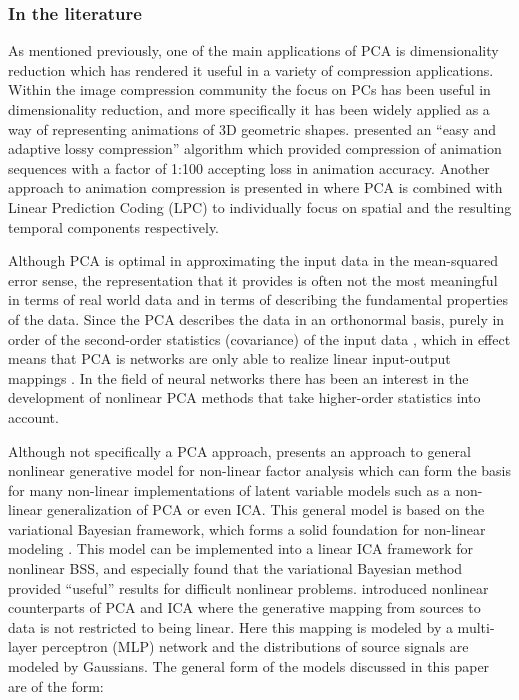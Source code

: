 \subsubsection{In the literature}
As mentioned previously, one of the main applications of PCA is dimensionality reduction which has rendered it useful in a variety of compression applications. Within the image compression community \citep{Vasilescu2003} the focus on PCs has been useful in dimensionality reduction, and more specifically it has been widely applied as a way of representing animations of 3D geometric shapes. \cite{Alexa2000} presented an ``easy and adaptive lossy compression'' algorithm which provided compression of animation sequences with a factor of 1:100 accepting loss in animation accuracy. Another approach to animation compression is presented in \cite{Karni2004} where PCA is combined with Linear Prediction Coding (LPC) to individually focus on spatial and the resulting temporal components respectively.

Although PCA is optimal in approximating the input data in the mean-squared error sense, the representation that it provides is often not the most meaningful in terms of real world data and in terms of describing the fundamental properties of the data. Since the PCA describes the data in an orthonormal basis, purely in order of the second-order statistics (covariance) of the input data \citep{Oja1995}, which in effect means that PCA is networks are only able to realize linear input-output mappings \citep{Karhunen1995}. In the field of neural networks there has been an interest in the development of nonlinear PCA methods that take higher-order statistics into account.

Although not specifically a PCA approach, \cite{Honkela2005} presents an approach to general nonlinear generative model for non-linear factor analysis which can form the basis for many non-linear implementations of latent variable models such as a non-linear generalization of PCA or even ICA. This general model is based on the variational Bayesian framework, which forms a solid foundation for non-linear modeling \citep{Honkela2005}. This model can be implemented into a linear ICA framework for nonlinear BSS, and especially \cite{Valpola2003} found that the variational Bayesian method provided ``useful'' results for difficult nonlinear problems. \citep{Lappalainen2000} introduced nonlinear counterparts of PCA and ICA where the generative mapping from sources to data is not restricted to being linear. Here this mapping is modeled by a multi-layer perceptron (MLP) network and the distributions of source signals are modeled by Gaussians. The general form of the models discussed in this paper are of the form:

